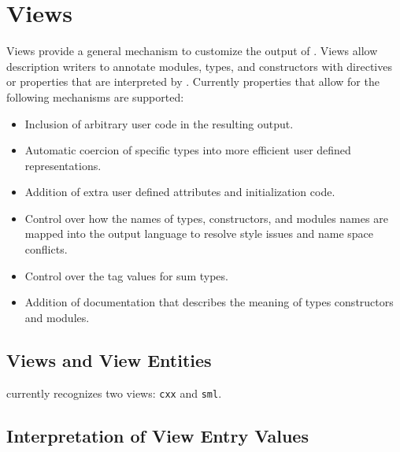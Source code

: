 %
\chapter{Views}
\label{chap:views}

Views provide a general mechanism to customize the output of
\asdlgen{}.
Views allow description writers to annotate modules, types, and constructors
with directives or properties that are interpreted by \asdlgen{}.
Currently \asdlgen{} properties that allow for the following mechanisms are
supported:
\begin{itemize}
  \item
    Inclusion of arbitrary user code in the resulting output.
  \item
    Automatic coercion of specific types into more efficient user
    defined representations.
  \item
    Addition of extra user defined attributes and initialization code.
  \item
    Control over how the names of types, constructors, and modules names
    are mapped into the output language to resolve style issues and name space
    conflicts.
  \item
    Control over the tag values for sum types.
  \item
    Addition of documentation that describes the meaning of types
    constructors and modules.
\end{itemize}%

\section{Views and View Entities}

\asdlgen{} currently recognizes two views: \texttt{cxx} and \texttt{sml}.

\section{Interpretation of View Entry Values}

